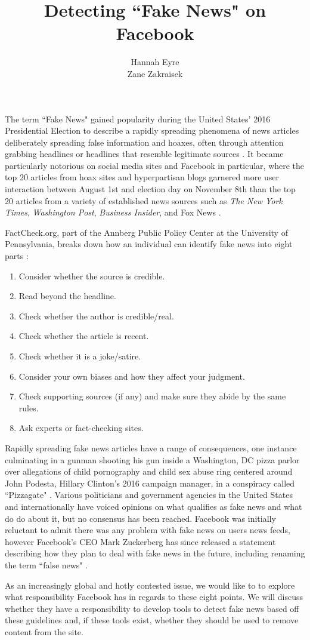 \documentclass[11pt]{article}
\title{Detecting ``Fake News" on Facebook}
\author{Hannah Eyre\\
	Zane Zakraisek}
\begin{document}
\maketitle

The term ``Fake News" gained popularity during the United States' 2016 Presidential Election to describe a rapidly spreading phenomena of news articles deliberately spreading false information and hoaxes, often through attention grabbing headlines or headlines that resemble legitimate sources \cite{guardian}. It became particularly notorious on social media sites and Facebook in particular, where the top 20 articles from hoax sites and hyperpartisan blogs garnered more user interaction between August 1st and election day on November 8th than the top 20 articles from a variety of established news sources such as {\it The New York Times}, {\it Washington Post}, {\it Business Insider}, and Fox News \cite{buzzfeed}.

FactCheck.org, part of the Annberg Public Policy Center at the University of Pennsylvania, breaks down how an individual can identify fake news into eight parts \cite{factcheck}:
\begin{enumerate}
\item Consider whether the source is credible.
\item Read beyond the headline.
\item Check whether the author is credible/real.
\item Check whether the article is recent.
\item Check whether it is a joke/satire.
\item Consider your own biases and how they affect your judgment.
\item Check supporting sources (if any) and make sure they abide by the same rules.
\item Ask experts or fact-checking sites.
\end{enumerate}

Rapidly spreading fake news articles have a range of consequences, one instance culminating in a gunman shooting his gun inside a Washington, DC pizza parlor over allegations of child pornography and child sex abuse ring centered around John Podesta, Hillary Clinton's 2016 campaign manager, in a conspiracy called ``Pizzagate" \cite{pizzagate}. Various politicians and government agencies in the United States and internationally have voiced opinions on what qualifies as fake news and what do do about it, but no consensus has been reached. Facebook was initially reluctant to admit there was any problem with fake news on users news feeds, however Facebook's CEO Mark Zuckerberg has since released a statement describing how they plan to deal with fake news in the future, including renaming the term ``false news" \cite{zuckerberg}.

As an increasingly global and hotly contested issue, we would like to to explore what responsibility Facebook has in regards to these eight points. We will discuss whether they have a responsibility to develop tools to detect fake news based off these guidelines and, if these tools exist, whether they should be used to remove content from the site.
\end{document}
